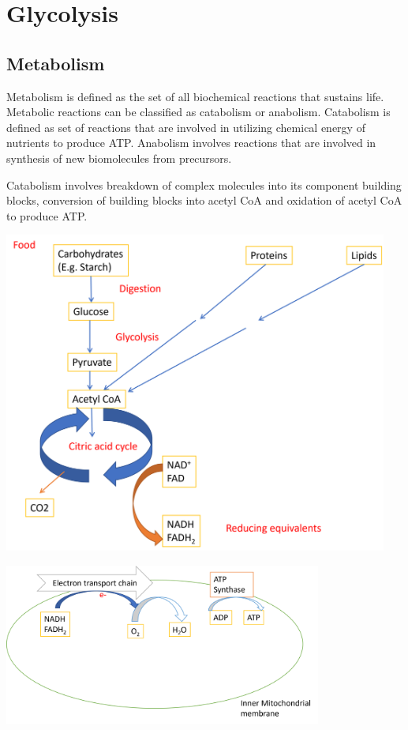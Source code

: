 \documentclass[
]{book}
\begin{document}
\chapter{Glycolysis}\label{glycolysis}

\section{Metabolism}\label{metabolism}

Metabolism is defined as the set of all biochemical reactions that sustains life. Metabolic reactions can be classified as catabolism or anabolism. Catabolism is defined as set of reactions that are involved in utilizing chemical energy of nutrients to produce ATP. Anabolism involves reactions that are involved in synthesis of new biomolecules from precursors.

Catabolism involves breakdown of complex molecules into its component building blocks, conversion of building blocks into acetyl CoA and oxidation of acetyl CoA to produce ATP.

\includegraphics[width=\textwidth,height=4.16667in]{Images/NADH.png}

\includegraphics[width=\textwidth,height=2.08333in]{Images/ETC.png}
\end{document}
